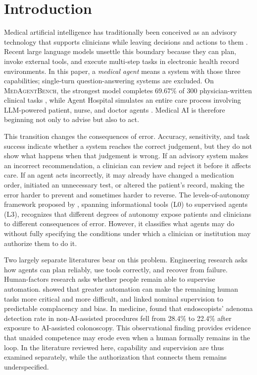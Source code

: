\section{Introduction}
\label{sec:intro}

Medical artificial intelligence has traditionally been conceived as an advisory technology that supports clinicians while leaving decisions and actions to them \citep{topol2019}. Recent large language models unsettle this boundary because they can plan, invoke external tools, and execute multi-step tasks in electronic health record environments. In this paper, a \emph{medical agent} means a system with those three capabilities; single-turn question-answering systems are excluded. On \textsc{MedAgentBench}, the strongest model completes 69.67\% of 300 physician-written clinical tasks \citep{jiang2025medagentbench}, while Agent Hospital simulates an entire care process involving LLM-powered patient, nurse, and doctor agents \citep{li2024agenthospital}. Medical AI is therefore beginning not only to advise but also to act.

This transition changes the consequences of error. Accuracy, sensitivity, and task success indicate whether a system reaches the correct judgement, but they do not show what happens when that judgement is wrong. If an advisory system makes an incorrect recommendation, a clinician can review and reject it before it affects care. If an agent acts incorrectly, it may already have changed a medication order, initiated an unnecessary test, or altered the patient's record, making the error harder to prevent and sometimes harder to reverse. The levels-of-autonomy framework proposed by \citet{ye2025autonomy}, spanning informational tools (L0) to supervised agents (L3), recognizes that different degrees of autonomy expose patients and clinicians to different consequences of error. However, it classifies what agents may do without fully specifying the conditions under which a clinician or institution may authorize them to do it.

Two largely separate literatures bear on this problem. Engineering research asks how agents can plan reliably, use tools correctly, and recover from failure. Human-factors research asks whether people remain able to supervise automation. \citet{bainbridge1983} showed that greater automation can make the remaining human tasks more critical and more difficult, and \citet{parasuraman2010} linked nominal supervision to predictable complacency and bias. In medicine, \citet{budzyn2025deskilling} found that endoscopists' adenoma detection rate in non-AI-assisted procedures fell from 28.4\% to 22.4\% after exposure to AI-assisted colonoscopy. This observational finding provides evidence that unaided competence may erode even when a human formally remains in the loop. In the literature reviewed here, capability and supervision are thus examined separately, while the authorization that connects them remains underspecified.

